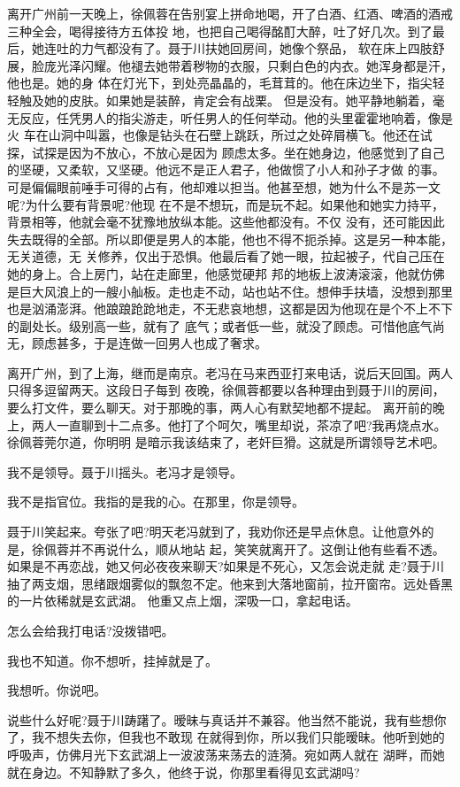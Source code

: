 \documentclass[11pt,a4paper,onecolumn]{article}
\begin{document}
离开广州前一天晚上，徐佩蓉在告别宴上拼命地喝，开了白酒、红酒、啤酒的酒戒三种全会，喝得接待方五体投
地，也把自己喝得酩酊大醉，吐了好几次。到了最后，她连吐的力气都没有了。聂于川扶她回房间，她像个祭品，
软在床上四肢舒展，脸庞光泽闪耀。他褪去她带着秽物的衣服，只剩白色的内衣。她浑身都是汗，他也是。她的身
体在灯光下，到处亮晶晶的，毛茸茸的。他在床边坐下，指尖轻轻触及她的皮肤。如果她是装醉，肯定会有战栗。
但是没有。她平静地躺着，毫无反应，任凭男人的指尖游走，听任男人的任何举动。他的头里霍霍地响着，像是火
车在山洞中叫嚣，也像是钻头在石壁上跳跃，所过之处碎屑横飞。他还在试探，试探是因为不放心，不放心是因为
顾虑太多。坐在她身边，他感觉到了自己的坚硬，又柔软，又坚硬。他远不是正人君子，他做惯了小人和孙子才做
的事。可是偏偏眼前唾手可得的占有，他却难以担当。他甚至想，她为什么不是苏一文呢?为什么要有背景呢?他现
在不是不想玩，而是玩不起。如果他和她实力持平，背景相等，他就会毫不犹豫地放纵本能。这些他都没有。不仅
没有，还可能因此失去既得的全部。所以即便是男人的本能，他也不得不扼杀掉。这是另一种本能，无关道德，无
关修养，仅出于恐惧。他最后看了她一眼，拉起被子，代自己压在她的身上。合上房门，站在走廊里，他感觉硬邦
邦的地板上波涛滚滚，他就仿佛是巨大风浪上的一艘小舢板。走也走不动，站也站不住。想伸手扶墙，没想到那里
也是汹涌澎湃。他踉踉跄跄地走，不无悲哀地想，这都是因为他现在是个不上不下的副处长。级别高一些，就有了
底气；或者低一些，就没了顾虑。可惜他底气尚无，顾虑甚多，于是连做一回男人也成了奢求。

离开广州，到了上海，继而是南京。老冯在马来西亚打来电话，说后天回国。两人只得多逗留两天。这段日子每到
夜晚，徐佩蓉都要以各种理由到聂于川的房间，要么打文件，要么聊天。对于那晚的事，两人心有默契地都不提起。
离开前的晚上，两人一直聊到十二点多。他打了个呵欠，嘴里却说，茶凉了吧?我再烧点水。徐佩蓉莞尔道，你明明
是暗示我该结束了，老奸巨猾。这就是所谓领导艺术吧。

我不是领导。聂于川摇头。老冯才是领导。

我不是指官位。我指的是我的心。在那里，你是领导。

聂于川笑起来。夸张了吧?明天老冯就到了，我劝你还是早点休息。让他意外的是，徐佩蓉并不再说什么，顺从地站
起，笑笑就离开了。这倒让他有些看不透。如果是不再恋战，她又何必夜夜来聊天?如果是不死心，又怎会说走就
走?聂于川抽了两支烟，思绪跟烟雾似的飘忽不定。他来到大落地窗前，拉开窗帘。远处昏黑的一片依稀就是玄武湖。
他重又点上烟，深吸一口，拿起电话。

怎么会给我打电话?没拨错吧。

我也不知道。你不想听，挂掉就是了。

我想听。你说吧。

说些什么好呢?聂于川踌躇了。暧昧与真话并不兼容。他当然不能说，我有些想你了，我不想失去你，但我也不敢现
在就得到你，所以我们只能暧昧。他听到她的呼吸声，仿佛月光下玄武湖上一波波荡来荡去的涟漪。宛如两人就在
湖畔，而她就在身边。不知静默了多久，他终于说，你那里看得见玄武湖吗?
\end{document}

